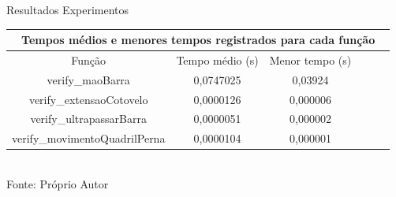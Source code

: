 \begin{frame}{Resultados Experimentos}
    \fontsize{7pt}{8pt}\selectfont
    \begin{table}[H]
    \centering
    \begin{tabular}{@{}cccccc@{}}
    \toprule
    \multicolumn{6}{c}{Tempos médios e menores tempos registrados para cada função}
    \\ \midrule
    Função & Tempo médio (s) & Menor tempo (s) \\
    \midrule
    verify\_maoBarra & 0,0747025 & 0,03924 \\
    verify\_extensaoCotovelo & 0,0000126 & 0,000006  \\
    verify\_ultrapassarBarra & 0,0000051 & 0,000002  \\
    verify\_movimentoQuadrilPerna & 0,0000104 & 0,000001  \\
    \bottomrule
    \end{tabular}
    \label{tab:tempos_funcoes_especificas}
    \\
    {Fonte: Próprio Autor}
    \end{table}
\end{frame}
